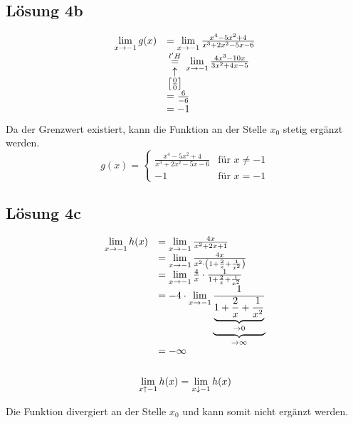\documentclass[main.tex]{subfiles}
\begin{document}
\subsection{Lösung 4b}
\begin{equation*}
    \begin{array}{ c l }
    \lim\limits _{x\rightarrow -1} g( x) & =\lim\limits _{x\rightarrow -1}\frac{x^{4} -5x^{2} +4}{x^{3} +2x^{2} -5x-6}\\
     & \underset{\arraycolsep=1pt\def\arraystretch{1}
     \begin{array}{c}
    \uparrow \\
    \left[\frac{0}{0}\right]
    \end{array}}{\overset{l'H}{=}}\lim\limits _{x\rightarrow -1}\frac{4x^{3} -10x}{3x^{2} +4x-5}\\
     & =\frac{6}{-6}\\
     & =-1
    \end{array}
    \end{equation*}
    Da der Grenzwert existiert, kann die Funktion an der Stelle $x_{0}$ stetig ergänzt werden.
    \begin{equation*}
    g( x) =\begin{cases}
    \frac{x^{4} -5x^{2} +4}{x^{3} +2x^{2} -5x-6} & \text{für } x\neq -1\\
    -1 & \text{für } x=-1
    \end{cases}
\end{equation*}


\subsection{Lösung 4c}
\begin{gather*}
    \begin{array}{ c l }
    \lim\limits _{x\rightarrow -1} h( x) & =\lim\limits _{x\rightarrow -1}\frac{4x}{x^{2} +2x+1}\\
     & =\lim\limits _{x\rightarrow -1}\frac{4x}{x^{2} \cdotp \left( 1+\frac{2}{x} +\frac{1}{x^{2}}\right)}\\
     & =\lim\limits _{x\rightarrow -1}\frac{4}{x} \cdotp \frac{1}{1+\frac{2}{x} +\frac{1}{x^{2}}}\\
     & =-4\cdot \lim\limits _{x\rightarrow -1}\underbrace{\frac{1}{\underbrace{1+\frac{2}{x} +\frac{1}{x^{2}}}_{\rightarrow 0}}}_{\rightarrow \infty }\\
     & =-\infty
    \end{array}\\
    \\
    \lim\limits _{x\uparrow -1} h( x) =\lim\limits _{x\downarrow -1} h( x)
\end{gather*}

Die Funktion divergiert an der Stelle $x_{0}$ und kann somit nicht ergänzt werden.
\end{document}
